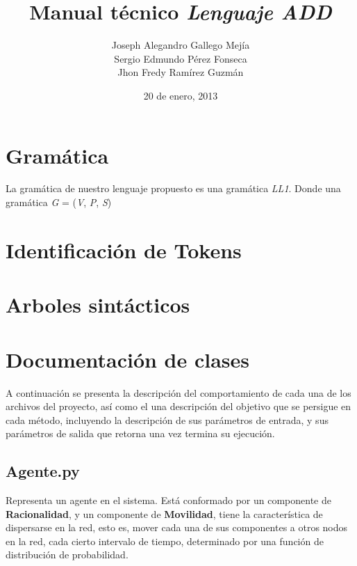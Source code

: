 \documentclass{article}
\begin{document}
\title{Manual técnico \textit{Lenguaje ADD}}
\author{Joseph Alegandro Gallego Mejía\\
Sergio Edmundo Pérez Fonseca\\
Jhon Fredy Ramírez Guzmán}
\date{20 de enero, 2013}
\maketitle

\section{Gramática}

La gramática de nuestro lenguaje propuesto es una gramática \textit{LL1}. Donde una gramática \textit{G} = (\textit{V}, \textit{P}, \textit{S})
\section{Identificación de Tokens}
\section{Arboles sintácticos}

\section{Documentación de clases}
A continuación se presenta la descripción del comportamiento de cada una de los archivos del proyecto, así como el una descripción del objetivo que se persigue en cada método, incluyendo la descripción de sus parámetros de entrada, y sus parámetros de salida que retorna una vez termina su ejecución.

\subsection{Agente.py}
Representa un agente en el sistema. Está conformado por un componente de \textbf{Racionalidad}, y un componente de \textbf{Movilidad}, tiene la característica de dispersarse en la red, esto es, mover cada una de sus componentes a otros nodos en la red, cada cierto intervalo de tiempo, determinado por una función de distribución de probabilidad.\\
\end{document}
